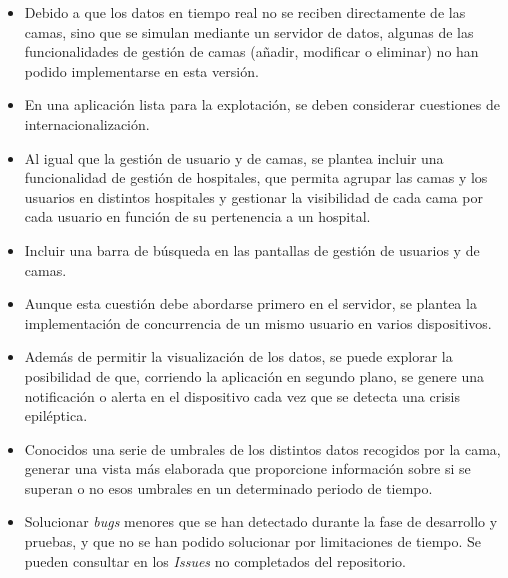 \begin{itemize}
	\item Debido a que los datos en tiempo real no se reciben directamente de las camas, sino que se simulan mediante un servidor de datos, algunas de las funcionalidades de gestión de camas (añadir, modificar o eliminar) no han podido implementarse en esta versión. 
	\item En una aplicación lista para la explotación, se deben considerar cuestiones de internacionalización. 
	\item Al igual que la gestión de usuario y de camas, se plantea incluir una funcionalidad de gestión de hospitales, que permita agrupar las camas y los usuarios en distintos hospitales y gestionar la visibilidad de cada cama por cada usuario en función de su pertenencia a un hospital. 
	\item Incluir una barra de búsqueda en las pantallas de gestión de usuarios y de camas. 
	\item Aunque esta cuestión debe abordarse primero en el servidor, se plantea la implementación de concurrencia de un mismo usuario en varios dispositivos. 
	\item Además de permitir la visualización de los datos, se puede explorar la posibilidad de que, corriendo la aplicación en segundo plano, se genere una notificación o alerta en el dispositivo cada vez que se detecta una crisis epiléptica. 
	\item Conocidos una serie de umbrales de los distintos datos recogidos por la cama, generar una vista más elaborada que proporcione información sobre si se superan o no esos umbrales en un determinado periodo de tiempo. 
	\item Solucionar \textit{bugs} menores que se han detectado durante la fase de desarrollo y pruebas, y que no se han podido solucionar por limitaciones de tiempo. Se pueden consultar en los \textit{Issues} no completados del repositorio. 
\end{itemize}


